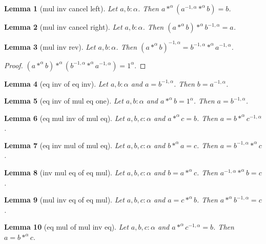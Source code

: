 \documentclass[12pt]{article}
\newtheorem{lemma}{Lemma}
\begin{document}
\begin{lemma}[mul inv cancel left] Let $a,b : \alpha$. Then
$a *^{\alpha} (a^{-1,\alpha} *^{\alpha} b) = b$.
\end{lemma}

\begin{lemma}[mul inv cancel right]
Let $a,b : \alpha$. Then
$(a *^{\alpha} b) *^{\alpha} b^{-1,\alpha} = a$.
\end{lemma}

\begin{lemma}[mul inv rev] Let $a,b : \alpha$. Then
$(a *^{\alpha} b)^{-1,\alpha} = b^{-1,\alpha} *^{\alpha} a^{-1,\alpha}$.
\end{lemma}
\begin{proof} 
$(a *^{\alpha} b) *^{\alpha} (b^{-1,\alpha} *^{\alpha} a^{-1,\alpha})
= 1^{\alpha}$.
\end{proof}

\begin{lemma}[eq inv of eq inv] Let $a,b : \alpha$ and $a = b^{-1,\alpha}$.
Then $b = a^{-1,\alpha}$.
\end{lemma}

\begin{lemma}[eq inv of mul eq one] Let $a,b : \alpha$ and
$a *^{\alpha} b = 1^{\alpha}$. Then $a = b^{-1,\alpha}$.
\end{lemma}

\begin{lemma}[eq mul inv of mul eq] Let $a,b,c : \alpha$ and
$a *^{\alpha} c = b$. Then $a = b *^{\alpha} c^{-1,\alpha}$.
\end{lemma}

\begin{lemma}[eq inv mul of mul eq] Let $a,b,c : \alpha$ and
$b *^{\alpha} a = c$. Then $a = b^{-1,\alpha} *^{\alpha} c$.
\end{lemma}

\begin{lemma}[inv mul eq of eq mul] Let $a,b,c : \alpha$ and
$b = a *^{\alpha} c$. Then $a^{-1,\alpha} *^{\alpha} b = c$.
\end{lemma}

\begin{lemma}[mul inv eq of eq mul] Let $a,b,c : \alpha$ and
$a = c *^{\alpha} b$. Then $a *^{\alpha} b^{-1,\alpha} = c$.
\end{lemma}

\begin{lemma}[eq mul of mul inv eq] Let $a,b,c : \alpha$ and
$a *^{\alpha} c^{-1,\alpha} = b$. Then $a = b *^{\alpha} c$.
\end{lemma}
\end{document}

